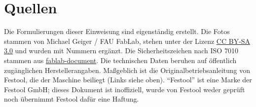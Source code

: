 \documentclass{\basedir/fablab-document}
\begin{document}
	\section{Quellen}
	Die Formulierungen dieser Einweisung sind eigenständig erstellt. Die Fotos stammen von Michael Geiger / FAU FabLab, stehen unter der Lizenz \href{https://creativecommons.org/licenses/by-sa/3.0/}{CC BY-SA 3.0} und wurden mit Nummern ergänzt. Die Sicherheitszeichen nach ISO 7010 stammen aus \href{https://github.com/fau-fablab/fablab-document}{fablab-document}. Die technischen Daten beruhen auf öffentlich zugänglichen Herstellerangaben. Maßgeblich ist die Originalbetriebsanleitung von Festool, die der Maschine beiliegt (Links siehe oben). \enquote{Festool} ist eine Marke der Festool GmbH; dieses Dokument ist inoffiziell, wurde von Festool weder geprüft noch übernimmt Festool dafür eine Haftung.

\end{document}
